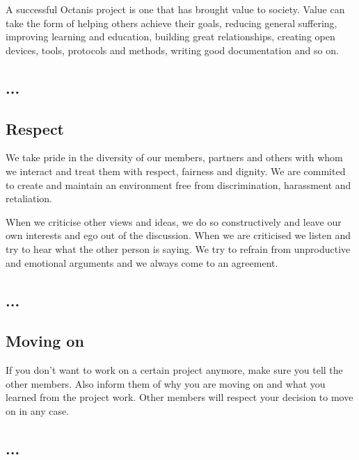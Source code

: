 	A successful Octanis project is one that has brought value to society. Value can take the form of helping others achieve their goals, reducing general suffering, improving learning and education, building great relationships, creating open devices, tools, protocols and methods, writing good documentation and so on.


\french
	\subsection{...}


\english
	\subsection{Respect}
 	We take pride in the diversity of our members, partners and others with whom we interact and treat them with respect, fairness and dignity. We are commited to create and maintain an environment free from discrimination, harassment and retaliation. 

 	When we criticise other views and ideas, we do so constructively and leave our own interests and ego out of the discussion. 
 	When we are criticised we listen and try to hear what the other person is saying. 
 	We try to refrain from unproductive and emotional arguments and we always come to an agreement.


\french
	\subsection{...}


\english
	\subsection{Moving on}
	If you don't want to work on a certain project anymore, make sure you tell the other members. Also inform them of why you are moving on and what you learned from the project work. Other members will respect your decision to move on in any case.

\french
	\subsection{...}



